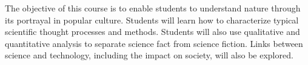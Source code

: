 {The objective of this course is to enable students to understand nature through its portrayal in popular culture. Students will learn how to characterize typical scientific thought processes and methods. Students will also use qualitative and quantitative analysis to separate science fact from science fiction. Links between science and technology, including the impact on society, will also be explored.}
